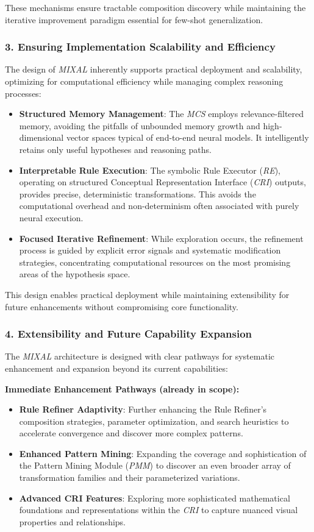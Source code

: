 \documentclass[12pt]{article}
\newcommand{\MIXAL}{\textit{MIXAL}}
\newcommand{\pmm}{\textit{PMM}}
\newcommand{\mcs}{\textit{MCS}}
\newcommand{\re}{\textit{RE}}
\newcommand{\cri}{\textit{CRI}}
\begin{document}
These mechanisms ensure tractable composition discovery while maintaining the iterative improvement paradigm essential for few-shot generalization.

\subsubsection{3. Ensuring Implementation Scalability and Efficiency}
The design of \MIXAL{} inherently supports practical deployment and scalability, optimizing for computational efficiency while managing complex reasoning processes:
\begin{itemize}[noitemsep,topsep=0pt]
\item\textbf{Structured Memory Management}: The \mcs{} employs relevance-filtered memory, avoiding the pitfalls of unbounded memory growth and high-dimensional vector spaces typical of end-to-end neural models. It intelligently retains only useful hypotheses and reasoning paths.
\item\textbf{Interpretable Rule Execution}: The symbolic Rule Executor (\re{}), operating on structured Conceptual Representation Interface (\cri{}) outputs, provides precise, deterministic transformations. This avoids the computational overhead and non-determinism often associated with purely neural execution.
\item\textbf{Focused Iterative Refinement}: While exploration occurs, the refinement process is guided by explicit error signals and systematic modification strategies, concentrating computational resources on the most promising areas of the hypothesis space.
\end{itemize}

This design enables practical deployment while maintaining extensibility for future enhancements without compromising core functionality.

\subsubsection{4. Extensibility and Future Capability Expansion}
The \MIXAL{} architecture is designed with clear pathways for systematic enhancement and expansion beyond its current capabilities:

\textbf{Immediate Enhancement Pathways (already in scope):}
\begin{itemize}[noitemsep,topsep=0pt]
\item\textbf{Rule Refiner Adaptivity}: Further enhancing the Rule Refiner's composition strategies, parameter optimization, and search heuristics to accelerate convergence and discover more complex patterns.
\item\textbf{Enhanced Pattern Mining}: Expanding the coverage and sophistication of the Pattern Mining Module (\pmm{}) to discover an even broader array of transformation families and their parameterized variations.
\item\textbf{Advanced CRI Features}: Exploring more sophisticated mathematical foundations and representations within the \cri{} to capture nuanced visual properties and relationships.
\end{itemize}
\end{document}
